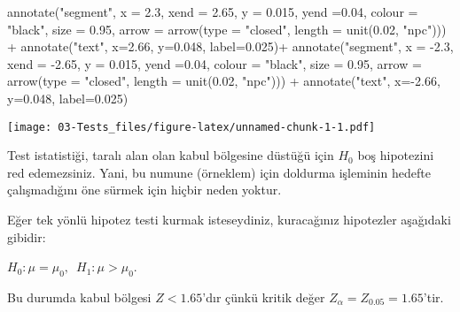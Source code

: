 \documentclass[
  12pt,
]{book}
\newenvironment{Shaded}{\begin{snugshade}}{\end{snugshade}}
\newcommand{\AttributeTok}[1]{\textcolor[rgb]{0.77,0.63,0.00}{#1}}
\newcommand{\FloatTok}[1]{\textcolor[rgb]{0.00,0.00,0.81}{#1}}
\newcommand{\FunctionTok}[1]{\textcolor[rgb]{0.00,0.00,0.00}{#1}}
\newcommand{\NormalTok}[1]{#1}
\newcommand{\SpecialCharTok}[1]{\textcolor[rgb]{0.00,0.00,0.00}{#1}}
\newcommand{\StringTok}[1]{\textcolor[rgb]{0.31,0.60,0.02}{#1}}
\begin{document}
\begin{Shaded}
\begin{Highlighting}[]
  \FunctionTok{annotate}\NormalTok{(}\StringTok{"segment"}\NormalTok{, }\AttributeTok{x =} \FloatTok{2.3}\NormalTok{, }\AttributeTok{xend =} \FloatTok{2.65}\NormalTok{, }\AttributeTok{y =} \FloatTok{0.015}\NormalTok{, }\AttributeTok{yend =}\FloatTok{0.04}\NormalTok{,}
           \AttributeTok{colour =} \StringTok{"black"}\NormalTok{, }\AttributeTok{size =} \FloatTok{0.95}\NormalTok{, }\AttributeTok{arrow =} \FunctionTok{arrow}\NormalTok{(}\AttributeTok{type =} \StringTok{"closed"}\NormalTok{, }\AttributeTok{length =} \FunctionTok{unit}\NormalTok{(}\FloatTok{0.02}\NormalTok{, }\StringTok{"npc"}\NormalTok{))) }\SpecialCharTok{+}
  \FunctionTok{annotate}\NormalTok{(}\StringTok{"text"}\NormalTok{, }\AttributeTok{x=}\FloatTok{2.66}\NormalTok{, }\AttributeTok{y=}\FloatTok{0.048}\NormalTok{, }\AttributeTok{label=}\StringTok{\textquotesingle{}0.025\textquotesingle{}}\NormalTok{)}\SpecialCharTok{+}
  \FunctionTok{annotate}\NormalTok{(}\StringTok{"segment"}\NormalTok{, }\AttributeTok{x =} \SpecialCharTok{{-}}\FloatTok{2.3}\NormalTok{, }\AttributeTok{xend =} \SpecialCharTok{{-}}\FloatTok{2.65}\NormalTok{, }\AttributeTok{y =} \FloatTok{0.015}\NormalTok{, }\AttributeTok{yend =}\FloatTok{0.04}\NormalTok{,}
           \AttributeTok{colour =} \StringTok{"black"}\NormalTok{, }\AttributeTok{size =} \FloatTok{0.95}\NormalTok{, }\AttributeTok{arrow =} \FunctionTok{arrow}\NormalTok{(}\AttributeTok{type =} \StringTok{"closed"}\NormalTok{, }\AttributeTok{length =} \FunctionTok{unit}\NormalTok{(}\FloatTok{0.02}\NormalTok{, }\StringTok{"npc"}\NormalTok{))) }\SpecialCharTok{+}
  \FunctionTok{annotate}\NormalTok{(}\StringTok{"text"}\NormalTok{, }\AttributeTok{x=}\SpecialCharTok{{-}}\FloatTok{2.66}\NormalTok{, }\AttributeTok{y=}\FloatTok{0.048}\NormalTok{, }\AttributeTok{label=}\StringTok{\textquotesingle{}0.025\textquotesingle{}}\NormalTok{)}
\end{Highlighting}
\end{Shaded}

\texttt{[image: 03-Tests\_files/figure-latex/unnamed-chunk-1-1.pdf]}

Test istatistiği, taralı alan olan kabul bölgesine düstüğü için \(H_{0}\) boş hipotezini red edemezsiniz. Yani, bu numune (örneklem) için doldurma işleminin hedefte çalışmadığını öne sürmek için hiçbir neden yoktur.

Eğer tek yönlü hipotez testi kurmak isteseydiniz, kuracağınız hipotezler aşağıdaki gibidir:

\(H_{0}: \mu = \mu_{0},\,\,\, H_{1}: \mu > \mu_{0}\).

Bu durumda kabul bölgesi \(Z < 1.65\)'dır çünkü kritik değer \(Z_{\alpha} = Z_{0.05} = 1.65\)'tir.
\end{document}
